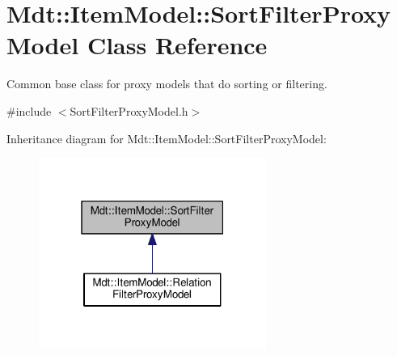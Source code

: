 \hypertarget{class_mdt_1_1_item_model_1_1_sort_filter_proxy_model}{}\section{Mdt\+:\+:Item\+Model\+:\+:Sort\+Filter\+Proxy\+Model Class Reference}
\label{class_mdt_1_1_item_model_1_1_sort_filter_proxy_model}


Common base class for proxy models that do sorting or filtering.  




{\ttfamily \#include $<$Sort\+Filter\+Proxy\+Model.\+h$>$}



Inheritance diagram for Mdt\+:\+:Item\+Model\+:\+:Sort\+Filter\+Proxy\+Model\+:
\nopagebreak
\begin{figure}[H]
\begin{center}
\leavevmode
\includegraphics[width=211pt]{class_mdt_1_1_item_model_1_1_sort_filter_proxy_model__inherit__graph}
\end{center}
\end{figure}
